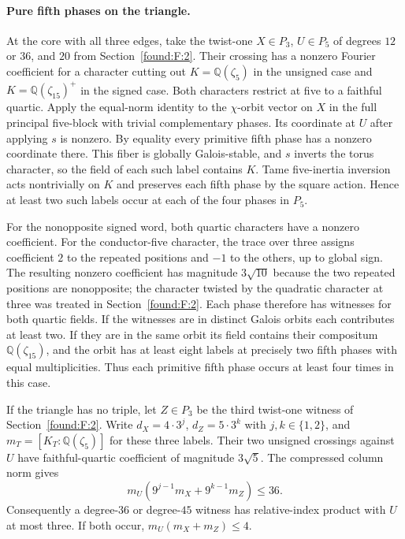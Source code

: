 \documentclass[11pt,a4paper]{article}
\numberwithin{equation}{section}
\theoremstyle{remark}
\begin{document}
\paragraph{Pure fifth phases on the triangle.}
At the core with all three edges, take the twist-one $X\in P_3$, $U\in P_5$ of degrees $12$ or $36$, and $20$ from Section~\ref{found:F:2}. Their crossing has a nonzero Fourier coefficient for a character cutting out $K=\mathbb Q(\zeta_5)$ in the unsigned case and $K=\mathbb Q(\zeta_{15})^+$ in the signed case. Both characters restrict at five to a faithful quartic. Apply the equal-norm identity to the $\chi$-orbit vector on $X$ in the full principal five-block with trivial complementary phases. Its coordinate at $U$ after applying $s$ is nonzero. By equality every primitive fifth phase has a nonzero coordinate there. This fiber is globally Galois-stable, and $s$ inverts the torus character, so the field of each such label contains $K$. Tame five-inertia inversion acts nontrivially on $K$ and preserves each fifth phase by the square action. Hence at least two such labels occur at each of the four phases in $P_5$.

For the nonopposite signed word, both quartic characters have a nonzero coefficient. For the conductor-five character, the trace over three assigns coefficient $2$ to the repeated positions and $-1$ to the others, up to global sign. The resulting nonzero coefficient has magnitude $3\sqrt{10}$ because the two repeated positions are nonopposite; the character twisted by the quadratic character at three was treated in Section~\ref{found:F:2}. Each phase therefore has witnesses for both quartic fields. If the witnesses are in distinct Galois orbits each contributes at least two. If they are in the same orbit its field contains their compositum $\mathbb Q(\zeta_{15})$, and the orbit has at least eight labels at precisely two fifth phases with equal multiplicities. Thus each primitive fifth phase occurs at least four times in this case.

If the triangle has no triple, let $Z\in P_3$ be the third twist-one witness of Section~\ref{found:F:2}. Write $d_X=4\cdot3^j$, $d_Z=5\cdot3^k$ with $j,k\in\{1,2\}$, and $m_T=[K_T:\mathbb Q(\zeta_5)]$ for these three labels. Their two unsigned crossings against $U$ have faithful-quartic coefficient of magnitude $3\sqrt5$. The compressed column norm gives
\[
               m_U(9^{j-1}m_X+9^{k-1}m_Z)\le 36.
\]
Consequently a degree-$36$ or degree-$45$ witness has relative-index product with $U$ at most three. If both occur, $m_U(m_X+m_Z)\le4$.
\end{document}
